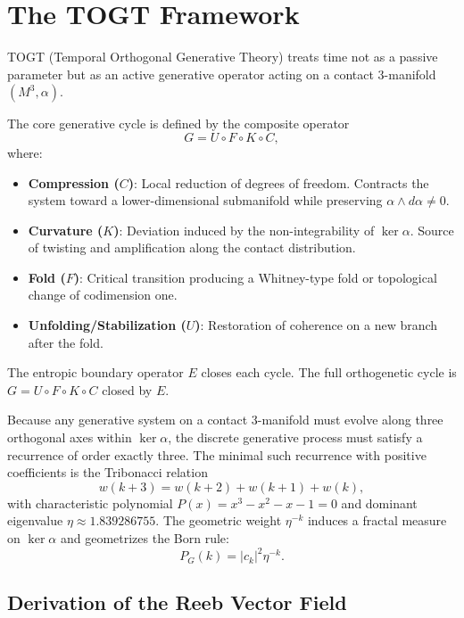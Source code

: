 \documentclass[11pt,a4paper]{article}
\theoremstyle{definition}
\theoremstyle{remark}
\begin{document}
\section{The TOGT Framework}

TOGT (Temporal Orthogonal Generative Theory) treats time not as a passive parameter but as
an active generative operator acting on a contact 3-manifold $(M^3,\alpha)$.

The core generative cycle is defined by the composite operator
\[
  G=U\circ F\circ K\circ C,
\]
where:
\begin{itemize}
  \item \textbf{Compression ($C$)}: Local reduction of degrees of freedom. Contracts the system
  toward a lower-dimensional submanifold while preserving $\alpha\wedge d\alpha\ne0$.
  \item \textbf{Curvature ($K$)}: Deviation induced by the non-integrability of $\ker\alpha$.
  Source of twisting and amplification along the contact distribution.
  \item \textbf{Fold ($F$)}: Critical transition producing a Whitney-type fold or topological
  change of codimension one.
  \item \textbf{Unfolding/Stabilization ($U$)}: Restoration of coherence on a new branch after
  the fold.
\end{itemize}

The entropic boundary operator $E$ closes each cycle. The full orthogenetic cycle is
$G=U\circ F\circ K\circ C$ closed by $E$.

Because any generative system on a contact 3-manifold must evolve along three orthogonal axes
within $\ker\alpha$, the discrete generative process must satisfy a recurrence of order exactly
three. The minimal such recurrence with positive coefficients is the Tribonacci relation
\[
  w(k+3)=w(k+2)+w(k+1)+w(k),
\]
with characteristic polynomial $P(x)=x^3-x^2-x-1=0$ and dominant eigenvalue $\eta\approx1.839286755$.
The geometric weight $\eta^{-k}$ induces a fractal measure on $\ker\alpha$ and geometrizes the Born rule:
\[
  P_G(k)=|c_k|^2\eta^{-k}.
\]

\subsection{Derivation of the Reeb Vector Field}
\end{document}
